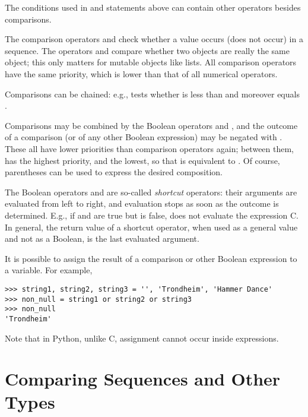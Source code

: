 \documentclass{manual}
\begin{document}
The conditions used in  and  statements above can
contain other operators besides comparisons.

The comparison operators  and  check whether a value
occurs (does not occur) in a sequence.  The operators  and
 compare whether two objects are really the same object; this
only matters for mutable objects like lists.  All comparison operators
have the same priority, which is lower than that of all numerical
operators.

Comparisons can be chained: e.g.,  tests whether 
is less than  and moreover  equals .

Comparisons may be combined by the Boolean operators  and
, and the outcome of a comparison (or of any other Boolean
expression) may be negated with .  These all have lower
priorities than comparison operators again; between them,  has
the highest priority, and  the lowest, so that
 is equivalent to .  Of
course, parentheses can be used to express the desired composition.

The Boolean operators  and  are so-called
\emph{shortcut} operators: their arguments are evaluated from left to
right, and evaluation stops as soon as the outcome is determined.
E.g., if  and  are true but  is false,  does not evaluate the expression C.  In general, the
return value of a shortcut operator, when used as a general value and
not as a Boolean, is the last evaluated argument.

It is possible to assign the result of a comparison or other Boolean
expression to a variable.  For example,

\begin{verbatim}
>>> string1, string2, string3 = '', 'Trondheim', 'Hammer Dance'
>>> non_null = string1 or string2 or string3
>>> non_null
'Trondheim'
\end{verbatim}

Note that in Python, unlike C, assignment cannot occur inside expressions.

\section{Comparing Sequences and Other Types \label{comparing}}
\end{document}
